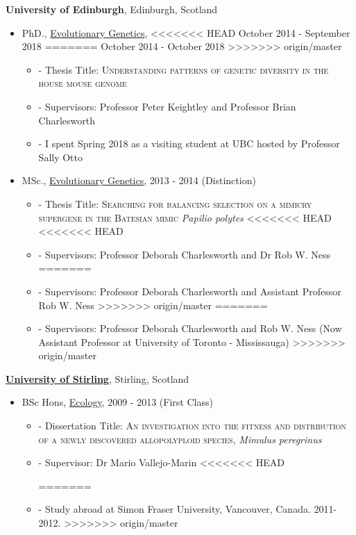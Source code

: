 \documentclass[11pt]{article}
\newenvironment{outerlist}[1][\enskip\textbullet]%
        {\begin{itemize}[#1,leftmargin=*]}{\end{itemize}%
         \vspace{-.6\baselineskip}}
\newenvironment{innerlist}[1][\enskip\textbullet]%
        {\begin{itemize}[#1,leftmargin=*,parsep=0pt,itemsep=0pt,topsep=0pt,partopsep=0pt]}
        {\end{itemize}}
\begin{document}
{\textbf{University of Edinburgh}},
Edinburgh, Scotland
\begin{outerlist}

\item[] PhD.,
             \href{http://www.ed.ac.uk/biology/evolutionary-biology} {Evolutionary Genetics},
<<<<<<< HEAD
             October 2014 - September 2018  
=======
             October 2014 - October 2018  
>>>>>>> origin/master
        \begin{innerlist}
        \item[]- Thesis Title: \textsc{Understanding patterns of genetic diversity in the house mouse genome}
        \item[]- Supervisors: Professor Peter Keightley and Professor Brian Charlesworth
        \item[]- I spent Spring 2018 as a visiting student at UBC hosted by Professor Sally Otto

        \end{innerlist}

\item[] MSc.,
        \href{http://qgen.bio.ed.ac.uk/}
             {Evolutionary Genetics},
             2013 - 2014 (Distinction)
        \begin{innerlist}
        \item[]- Thesis Title: \textsc{Searching for balancing selection on a mimicry supergene in the Batesian mimic} \textit{Papilio polytes}
<<<<<<< HEAD
<<<<<<< HEAD
        \item[]- Supervisors: Professor Deborah Charlesworth and Dr Rob W. Ness
=======
        \item[]- Supervisors: Professor Deborah Charlesworth and Assistant Professor Rob W. Ness
>>>>>>> origin/master
=======
        \item[]- Supervisors: Professor Deborah Charlesworth and Rob W. Ness (Now Assistant Professor at University of Toronto - Mississauga)
>>>>>>> origin/master

        \end{innerlist}
\end{outerlist}
\vspace{.1in}
\href{}{\textbf{University of Stirling}},
Stirling, Scotland
\begin{outerlist}
\item[] BSc Hons,
        \href{http://www.stir.ac.uk/natural-sciences/about-us/bes/}
             {Ecology}, 2009 - 2013 (First Class)
        \begin{innerlist}
        \item[]- Dissertation Title: \textsc{An investigation into the fitness and distribution of a newly discovered allopolyploid species,} \textit{Mimulus peregrinus}
        \item[]- Supervisor:
                   Dr Mario Vallejo-Marin
<<<<<<< HEAD

=======
		\item[]- Study abroad at Simon Fraser University, Vancouver, Canada. 2011-2012.
>>>>>>> origin/master
        \end{innerlist}
\end{outerlist}
\end{document}
